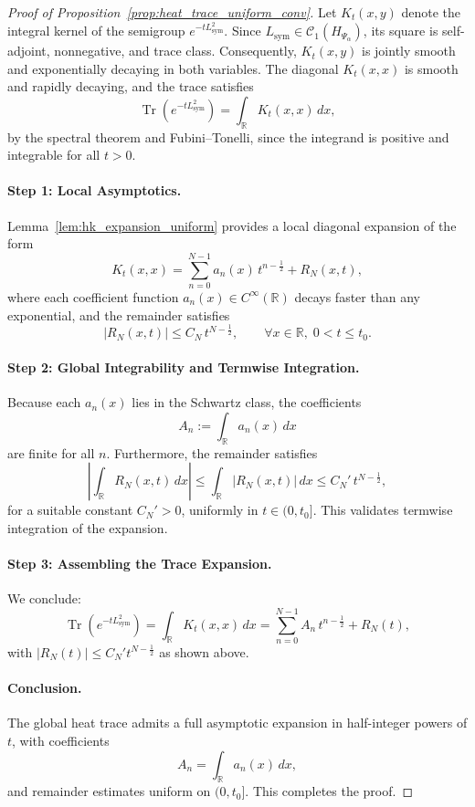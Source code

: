 \begin{proof}[Proof of Proposition~\ref{prop:heat_trace_uniform_conv}]
Let \( K_t(x,y) \) denote the integral kernel of the semigroup \( e^{-t L_{\mathrm{sym}}^2} \). Since \( L_{\mathrm{sym}} \in \mathcal{C}_1(H_{\Psi_\alpha}) \), its square is self-adjoint, nonnegative, and trace class. Consequently, \( K_t(x,y) \) is jointly smooth and exponentially decaying in both variables. The diagonal \( K_t(x,x) \) is smooth and rapidly decaying, and the trace satisfies
\[
\operatorname{Tr}(e^{-t L_{\mathrm{sym}}^2}) = \int_{\mathbb{R}} K_t(x,x) \, dx,
\]
by the spectral theorem and Fubini–Tonelli, since the integrand is positive and integrable for all \( t > 0 \).

\paragraph{Step 1: Local Asymptotics.}
Lemma~\ref{lem:hk_expansion_uniform} provides a local diagonal expansion of the form
\[
K_t(x,x) = \sum_{n=0}^{N-1} a_n(x) \, t^{n - \frac{1}{2}} + R_N(x,t),
\]
where each coefficient function \( a_n(x) \in C^\infty(\mathbb{R}) \) decays faster than any exponential, and the remainder satisfies
\[
|R_N(x,t)| \leq C_N \, t^{N - \frac{1}{2}}, \qquad \forall x \in \mathbb{R}, \; 0 < t \leq t_0.
\]

\paragraph{Step 2: Global Integrability and Termwise Integration.}
Because each \( a_n(x) \) lies in the Schwartz class, the coefficients
\[
A_n := \int_{\mathbb{R}} a_n(x) \, dx
\]
are finite for all \( n \). Furthermore, the remainder satisfies
\[
\left| \int_{\mathbb{R}} R_N(x,t)\, dx \right| \leq \int_{\mathbb{R}} |R_N(x,t)| \, dx \leq C_N' \, t^{N - \frac{1}{2}},
\]
for a suitable constant \( C_N' > 0 \), uniformly in \( t \in (0, t_0] \). This validates termwise integration of the expansion.

\paragraph{Step 3: Assembling the Trace Expansion.}
We conclude:
\[
\operatorname{Tr}(e^{-t L_{\mathrm{sym}}^2}) = \int_{\mathbb{R}} K_t(x,x) \, dx = \sum_{n=0}^{N-1} A_n \, t^{n - \frac{1}{2}} + R_N(t),
\]
with \( |R_N(t)| \leq C_N' t^{N - \frac{1}{2}} \) as shown above.

\paragraph{Conclusion.}
The global heat trace admits a full asymptotic expansion in half-integer powers of \( t \), with coefficients
\[
A_n = \int_{\mathbb{R}} a_n(x) \, dx,
\]
and remainder estimates uniform on \( (0, t_0] \). This completes the proof.
\end{proof}
